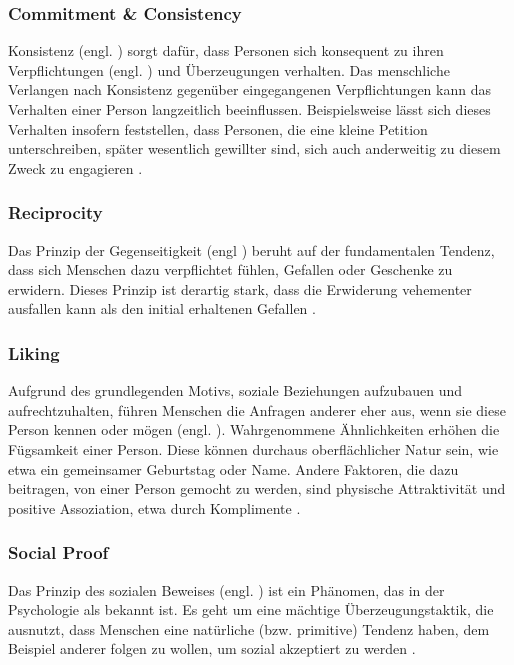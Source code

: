 \subsubsection{Commitment \& Consistency}
Konsistenz (engl. ) sorgt dafür, dass Personen sich konsequent zu ihren Verpflichtungen (engl. ) und Überzeugungen verhalten.
Das menschliche Verlangen nach Konsistenz gegenüber eingegangenen Verpflichtungen kann das Verhalten einer Person langzeitlich beeinflussen.
Beispielsweise lässt sich dieses Verhalten insofern feststellen, dass Personen, die eine kleine Petition unterschreiben, später wesentlich gewillter sind, sich auch anderweitig zu diesem Zweck zu engagieren .

\subsubsection{Reciprocity}
Das Prinzip der Gegenseitigkeit (engl ) beruht auf der fundamentalen Tendenz, dass sich Menschen dazu verpflichtet fühlen, Gefallen oder Geschenke zu erwidern.
Dieses Prinzip ist derartig stark, dass die Erwiderung vehementer ausfallen kann als den initial erhaltenen Gefallen .

\subsubsection{Liking}
Aufgrund des grundlegenden Motivs, soziale Beziehungen aufzubauen und aufrechtzuhalten, führen Menschen die Anfragen anderer eher aus, wenn sie diese Person kennen oder mögen (engl. ).
Wahrgenommene Ähnlichkeiten erhöhen die Fügsamkeit einer Person. Diese können durchaus oberflächlicher Natur sein, wie etwa ein gemeinsamer Geburtstag oder Name.
Andere Faktoren, die dazu beitragen, von einer Person gemocht zu werden, sind physische Attraktivität und positive Assoziation, etwa durch Komplimente .

\subsubsection{Social Proof}
Das Prinzip des sozialen Beweises (engl. ) ist ein Phänomen, das in der Psychologie als  bekannt ist.
Es geht um eine mächtige Überzeugungstaktik, die ausnutzt, dass Menschen eine natürliche (bzw. primitive) Tendenz haben, dem Beispiel anderer folgen zu wollen, um sozial akzeptiert zu werden .

